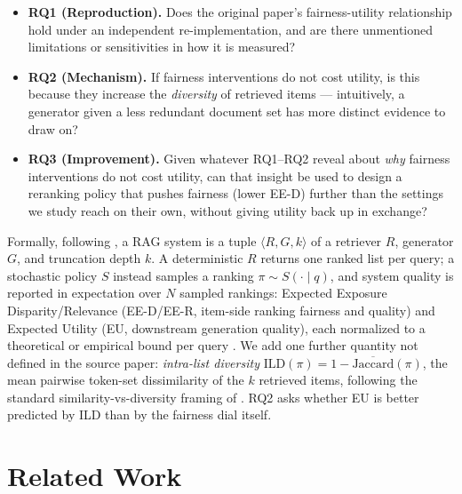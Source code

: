 \documentclass[10pt,twocolumn]{article}
\begin{document}
\begin{itemize}[leftmargin=1.1em]
  \item \textbf{RQ1 (Reproduction).} Does the original paper's fairness-utility
  relationship hold under an independent re-implementation, and are there
  unmentioned limitations or sensitivities in how it is measured?
  \item \textbf{RQ2 (Mechanism).} If fairness interventions do not cost utility, is
  this because they increase the \emph{diversity} of retrieved items --- intuitively,
  a generator given a less redundant document set has more distinct evidence to draw
  on?
  \item \textbf{RQ3 (Improvement).} Given whatever RQ1--RQ2 reveal about \emph{why}
  fairness interventions do not cost utility, can that insight be used to design a
  reranking policy that pushes fairness (lower EE-D) further than the settings we
  study reach on their own, without giving utility back up in exchange?
\end{itemize}

Formally, following \cite{eunkim2025fairrag}, a RAG system is a tuple
$\langle R, G, k \rangle$ of a retriever $R$, generator $G$, and truncation depth
$k$. A deterministic $R$ returns one ranked list per query; a stochastic policy $S$
instead samples a ranking $\pi \sim S(\cdot \mid q)$, and system quality is reported
in expectation over $N$ sampled rankings: Expected Exposure Disparity/Relevance
(EE-D/EE-R, item-side ranking fairness and quality) and Expected Utility (EU,
downstream generation quality), each normalized to a theoretical or empirical bound
per query \cite{diaz2020evaluating,eunkim2025fairrag}. We add one further quantity
not defined in the source paper: \emph{intra-list diversity}
$\mathrm{ILD}(\pi) = 1 - \overline{\mathrm{Jaccard}}(\pi)$, the mean pairwise
token-set dissimilarity of the $k$ retrieved items, following the standard
similarity-vs-diversity framing of \cite{smyth2001similarity}. RQ2 asks whether EU is
better predicted by ILD than by the fairness dial itself.

\section{Related Work}
\label{sec:related}
\end{document}
